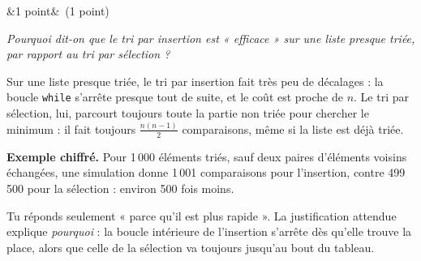 \documentclass[11pt, a4paper]{exam}
\newcommand{\code}[1]{\texttt{#1}}
\newcommand{\Q}[3]{\par\needspace{5\baselineskip}\bigskip\noindent{\large\bfseries Question #1}\ifx&#2&\else\ \textnormal{(#2)}\fi\par\nopagebreak\smallskip\noindent\textit{#3}\par\nopagebreak\smallskip}
\begin{document}
\Q{6 (c) iii}{1 point}{Pourquoi dit-on que le tri par insertion est « efficace » sur une liste presque triée, par rapport au tri par sélection ?}
\begin{reponse}
Sur une liste presque triée, le tri par insertion fait très peu de décalages : la boucle \code{while} s'arrête presque tout de suite, et le coût est proche de $n$. Le tri par sélection, lui, parcourt toujours toute la partie non triée pour chercher le minimum : il fait toujours $\frac{n(n-1)}{2}$ comparaisons, même si la liste est déjà triée.
\end{reponse}
\textbf{Exemple chiffré.} Pour 1\,000 éléments triés, sauf deux paires d'éléments voisins échangées, une simulation donne 1\,001 comparaisons pour l'insertion, contre 499\,500 pour la sélection : environ 500 fois moins.
\begin{erreur}
Tu réponds seulement « parce qu'il est plus rapide ». La justification attendue explique \emph{pourquoi} : la boucle intérieure de l'insertion s'arrête dès qu'elle trouve la place, alors que celle de la sélection va toujours jusqu'au bout du tableau.
\end{erreur}
\end{document}
